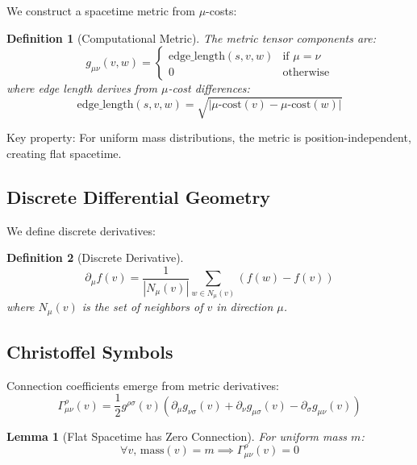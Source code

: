 \documentclass[11pt,twocolumn]{article}
\newtheorem{lemma}{Lemma}
\newtheorem{definition}{Definition}
\begin{document}
We construct a spacetime metric from $\mu$-costs:

\begin{definition}[Computational Metric]
The metric tensor components are:
\begin{equation}
g_{\mu\nu}(v,w) = \begin{cases}
\text{edge\_length}(s,v,w) & \text{if } \mu = \nu \\
0 & \text{otherwise}
\end{cases}
\end{equation}
where edge length derives from $\mu$-cost differences:
\begin{equation}
\text{edge\_length}(s,v,w) = \sqrt{|\mu\text{-cost}(v) - \mu\text{-cost}(w)|}
\end{equation}
\end{definition}

Key property: For uniform mass distributions, the metric is position-independent, creating flat spacetime.

\subsection{Discrete Differential Geometry}

We define discrete derivatives:
\begin{definition}[Discrete Derivative]
\begin{equation}
\partial_\mu f(v) = \frac{1}{|N_\mu(v)|} \sum_{w \in N_\mu(v)} (f(w) - f(v))
\end{equation}
where $N_\mu(v)$ is the set of neighbors of $v$ in direction $\mu$.
\end{definition}

\subsection{Christoffel Symbols}

Connection coefficients emerge from metric derivatives:
\begin{equation}
\Gamma^\rho_{\mu\nu}(v) = \frac{1}{2} g^{\rho\sigma}(v) \left(\partial_\mu g_{\nu\sigma}(v) + \partial_\nu g_{\mu\sigma}(v) - \partial_\sigma g_{\mu\nu}(v)\right)
\end{equation}

\begin{lemma}[Flat Spacetime has Zero Connection]
For uniform mass $m$:
\begin{equation}
\forall v, \, \text{mass}(v) = m \implies \Gamma^\rho_{\mu\nu}(v) = 0
\end{equation}
\end{lemma}
\end{document}
